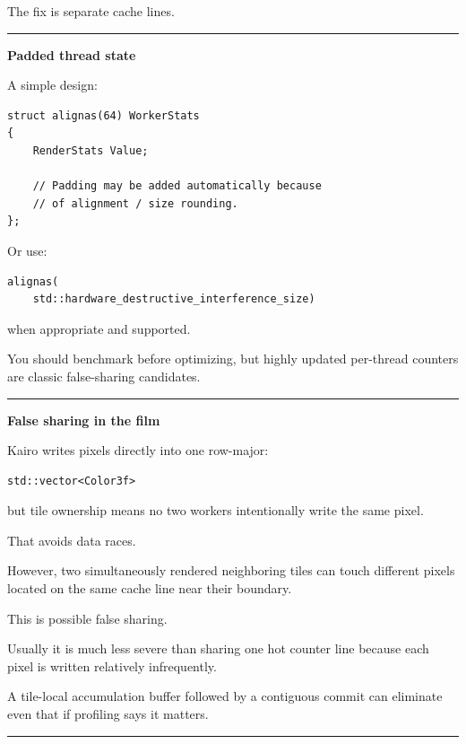 The fix is separate cache lines.

\begin{center}\rule{0.5\linewidth}{0.5pt}\end{center}

\textbf{Padded thread state}

A simple design:

\begin{verbatim}
struct alignas(64) WorkerStats
{
    RenderStats Value;

    // Padding may be added automatically because
    // of alignment / size rounding.
};
\end{verbatim}

Or use:

\begin{verbatim}
alignas(
    std::hardware_destructive_interference_size)
\end{verbatim}

when appropriate and supported.

You should benchmark before optimizing, but highly updated per-thread counters are classic false-sharing candidates.

\begin{center}\rule{0.5\linewidth}{0.5pt}\end{center}

\textbf{False sharing in the film}

Kairo writes pixels directly into one row-major:

\begin{verbatim}
std::vector<Color3f>
\end{verbatim}

but tile ownership means no two workers intentionally write the same pixel.

That avoids data races.

However, two simultaneously rendered neighboring tiles can touch different pixels located on the same cache line near their boundary.

This is possible false sharing.

Usually it is much less severe than sharing one hot counter line because each pixel is written relatively infrequently.

A tile-local accumulation buffer followed by a contiguous commit can eliminate even that if profiling says it matters.

\begin{center}\rule{0.5\linewidth}{0.5pt}\end{center}

